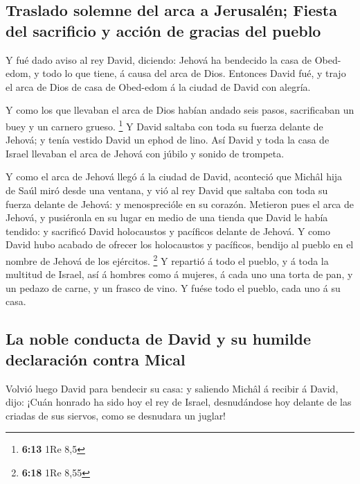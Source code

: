 \hypertarget{traslado-solemne-del-arca-a-jerusaluxe9n-fiesta-del-sacrificio-y-acciuxf3n-de-gracias-del-pueblo}{%
\subsection{Traslado solemne del arca a Jerusalén; Fiesta del sacrificio
y acción de gracias del
pueblo}\label{traslado-solemne-del-arca-a-jerusaluxe9n-fiesta-del-sacrificio-y-acciuxf3n-de-gracias-del-pueblo}}

 Y fué dado aviso al rey David, diciendo: Jehová ha
bendecido la casa de Obed-edom, y todo lo que tiene, á causa del arca de
Dios. Entonces David fué, y trajo el arca de Dios de casa de Obed-edom á
la ciudad de David con alegría.

 Y como los que llevaban el arca de Dios habían andado
seis pasos, sacrificaban un buey y un carnero grueso. \footnote{\textbf{6:13}
  1Re 8,5}  Y David saltaba con toda su fuerza delante de
Jehová; y tenía vestido David un ephod de lino.  Así
David y toda la casa de Israel llevaban el arca de Jehová con júbilo y
sonido de trompeta.

 Y como el arca de Jehová llegó á la ciudad de David,
aconteció que Michâl hija de Saúl miró desde una ventana, y vió al rey
David que saltaba con toda su fuerza delante de Jehová: y menosprecióle
en su corazón.  Metieron pues el arca de Jehová, y
pusiéronla en su lugar en medio de una tienda que David le había
tendido: y sacrificó David holocaustos y pacíficos delante de Jehová.
 Y como David hubo acabado de ofrecer los holocaustos y
pacíficos, bendijo al pueblo en el nombre de Jehová de los ejércitos.
\footnote{\textbf{6:18} 1Re 8,55}  Y repartió á todo el
pueblo, y á toda la multitud de Israel, así á hombres como á mujeres, á
cada uno una torta de pan, y un pedazo de carne, y un frasco de vino. Y
fuése todo el pueblo, cada uno á su casa.

\hypertarget{la-noble-conducta-de-david-y-su-humilde-declaraciuxf3n-contra-mical}{%
\subsection{La noble conducta de David y su humilde declaración contra
Mical}\label{la-noble-conducta-de-david-y-su-humilde-declaraciuxf3n-contra-mical}}

 Volvió luego David para bendecir su casa: y saliendo
Michâl á recibir á David, dijo: ¡Cuán honrado ha sido hoy el rey de
Israel, desnudándose hoy delante de las criadas de sus siervos, como se
desnudara un juglar!

